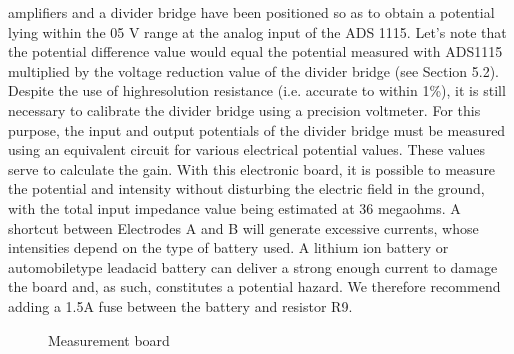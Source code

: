\documentclass[letterpaper,10pt,english]{sphinxmanual}
\let\sphinxpxdimen\pdfpxdimen\else\newdimen\sphinxpxdimen
\begin{document}
amplifiers and a divider bridge have been positioned so as to obtain a potential lying within the 0\sphinxhyphen{}5 V range at the analog input of the ADS 1115.
Let’s note that the potential difference value would equal the potential measured with ADS1115 multiplied by the voltage reduction
value of the divider bridge (see Section 5.2). Despite the use of high\sphinxhyphen{}resolution resistance (i.e. accurate to within 1\%), it is
still necessary to calibrate the divider bridge using a precision voltmeter. For this purpose, the input and output potentials
of the divider bridge must be measured using an equivalent circuit for various electrical potential values. These values serve
to calculate the gain. With this electronic board, it is possible to measure the potential and intensity without disturbing the
electric field in the ground, with the total input impedance value being estimated at 36 mega\sphinxhyphen{}ohms.
A shortcut between Electrodes A and B will generate excessive currents, whose intensities depend on the type of battery used.
A lithium ion battery or automobile\sphinxhyphen{}type lead\sphinxhyphen{}acid battery can deliver a strong enough current to damage the board and, as such,
constitutes a potential hazard. We therefore recommend adding a 1.5\sphinxhyphen{}A fuse between the battery and resistor R9.

\begin{figure}[htbp]
\centering
\capstart

\noindent\sphinxincludegraphics[width=800\sphinxpxdimen,height=400\sphinxpxdimen]{{schema_measurement_board}.jpg}
\caption{Measurement board}\label{\detokenize{V1_01:id1}}\end{figure}
\end{document}
